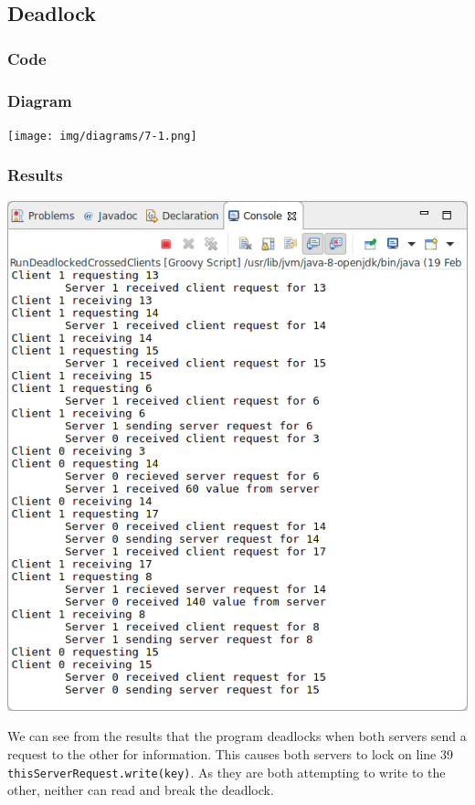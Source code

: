 \subsection{Deadlock}

\subsubsection*{Code}




\subsubsection*{Diagram}

\texttt{[image: img/diagrams/7-1.png]}

\subsubsection*{Results}

\includegraphics[width=\textwidth]{img/screenshots/7-1.png}

We can see from the results that the program deadlocks when both servers send a request to the other for information.  This causes both servers to lock on line 39 \texttt{thisServerRequest.write(key)}.  As they are both attempting to write to the other, neither can read and break the deadlock.